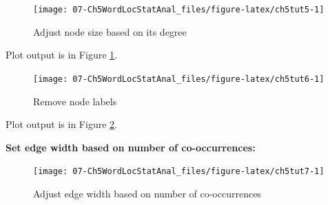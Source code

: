 \documentclass[
]{article}
\newenvironment{Shaded}{\begin{snugshade}}{\end{snugshade}}
\newcommand{\AttributeTok}[1]{\textcolor[rgb]{0.13,0.29,0.53}{#1}}
\newcommand{\ConstantTok}[1]{\textcolor[rgb]{0.56,0.35,0.01}{#1}}
\newcommand{\DecValTok}[1]{\textcolor[rgb]{0.00,0.00,0.81}{#1}}
\newcommand{\FunctionTok}[1]{\textcolor[rgb]{0.13,0.29,0.53}{\textbf{#1}}}
\newcommand{\NormalTok}[1]{#1}
\newcommand{\OtherTok}[1]{\textcolor[rgb]{0.56,0.35,0.01}{#1}}
\newcommand{\SpecialCharTok}[1]{\textcolor[rgb]{0.81,0.36,0.00}{\textbf{#1}}}
\newcommand{\StringTok}[1]{\textcolor[rgb]{0.31,0.60,0.02}{#1}}
\begin{document}
\begin{figure}

{\centering \texttt{[image: 07-Ch5WordLocStatAnal\_files/figure-latex/ch5tut5-1]} 

}

\caption{Adjust node size based on its degree}\label{fig:ch5tut5}
\end{figure}

Plot output is in Figure \ref{fig:ch5tut5}.

\begin{Shaded}
\end{Shaded}

\begin{figure}

{\centering \texttt{[image: 07-Ch5WordLocStatAnal\_files/figure-latex/ch5tut6-1]} 

}

\caption{Remove node labels}\label{fig:ch5tut6}
\end{figure}

Plot output is in Figure \ref{fig:ch5tut6}.

\textbf{Set edge width based on number of co-occurrences:}

\begin{Shaded}
\end{Shaded}

\begin{figure}

{\centering \texttt{[image: 07-Ch5WordLocStatAnal\_files/figure-latex/ch5tut7-1]} 

}

\caption{Adjust edge width based on number of co-occurrences}\label{fig:ch5tut7}
\end{figure}
\end{document}

